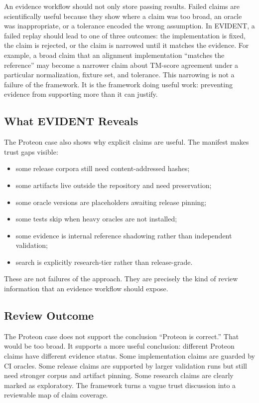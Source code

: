 \documentclass[10pt,twoside]{article}
\begin{document}
An evidence workflow should not only store passing results. Failed claims are
scientifically useful because they show where a claim was too broad, an oracle
was inappropriate, or a tolerance encoded the wrong assumption. In EVIDENT, a
failed replay should lead to one of three outcomes: the implementation is fixed,
the claim is rejected, or the claim is narrowed until it matches the evidence.
For example, a broad claim that an alignment implementation ``matches the
reference'' may become a narrower claim about TM-score agreement under a
particular normalization, fixture set, and tolerance. This narrowing is not a
failure of the framework. It is the framework doing useful work: preventing
evidence from supporting more than it can justify.

\subsection{What EVIDENT Reveals}

The Proteon case also shows why explicit claims are useful. The manifest makes
trust gaps visible:

\begin{itemize}[leftmargin=*]
  \item some release corpora still need content-addressed hashes;
  \item some artifacts live outside the repository and need preservation;
  \item some oracle versions are placeholders awaiting release pinning;
  \item some tests skip when heavy oracles are not installed;
  \item some evidence is internal reference shadowing rather than independent
        validation;
  \item search is explicitly research-tier rather than release-grade.
\end{itemize}

These are not failures of the approach. They are precisely the kind of review
information that an evidence workflow should expose.

\subsection{Review Outcome}

The Proteon case does not support the conclusion ``Proteon is correct.'' That
would be too broad. It supports a more useful conclusion: different Proteon
claims have different evidence status. Some implementation claims are guarded
by CI oracles. Some release claims are supported by larger validation runs but
still need stronger corpus and artifact pinning. Some research claims are
clearly marked as exploratory. The framework turns a vague trust discussion
into a reviewable map of claim coverage.
\end{document}
